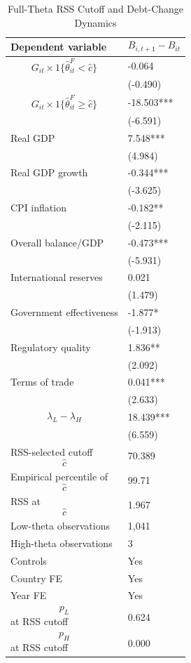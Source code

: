\begin{table}[H]\centering
\begin{threeparttable}
\caption{Full-Theta RSS Cutoff and Debt-Change Dynamics}
\label{tab:deltaB_rss_cutoff_fulltheta}
\scriptsize
\begin{tabularx}{\textwidth}{lY}
\toprule
Dependent variable & $$B_{i,t+1}-B_{it}$$ \\
\midrule
$$G_{it}\times 1\{\widehat{\theta}^{F}_{it}<\widehat{c}\}$$ & -0.064 \\
 & (-0.490) \\
$$G_{it}\times 1\{\widehat{\theta}^{F}_{it}\geq\widehat{c}\}$$ & -18.503*** \\
 & (-6.591) \\
Real GDP & 7.548*** \\
 & (4.984) \\
Real GDP growth & -0.344*** \\
 & (-3.625) \\
CPI inflation & -0.182** \\
 & (-2.115) \\
Overall balance/GDP & -0.473*** \\
 & (-5.931) \\
International reserves & 0.021 \\
 & (1.479) \\
Government effectiveness & -1.877* \\
 & (-1.913) \\
Regulatory quality & 1.836** \\
 & (2.092) \\
Terms of trade & 0.041*** \\
 & (2.633) \\
$$\lambda_L-\lambda_H$$ & 18.439*** \\
 & (6.559) \\
\midrule
RSS-selected cutoff $$\widehat{c}$$ & 70.389 \\
Empirical percentile of $$\widehat{c}$$ & 99.71 \\
RSS at $$\widehat{c}$$ & 1.967 \\
Low-theta observations & 1,041 \\
High-theta observations & 3 \\
Controls & Yes \\
Country FE & Yes \\
Year FE & Yes \\
$$p_L$$ at RSS cutoff & 0.624 \\
$$p_H$$ at RSS cutoff & 0.000 \\

\end{tabularx}
\end{threeparttable}
\end{table}
